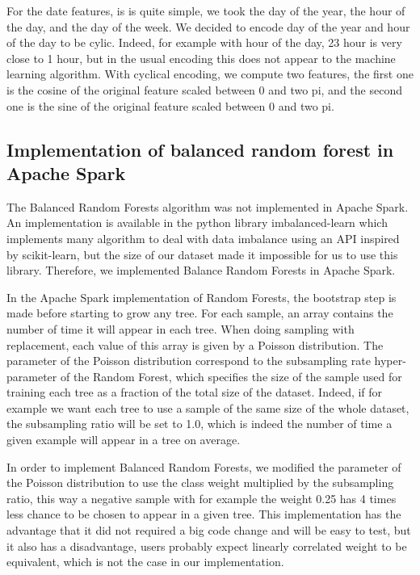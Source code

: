 \documentclass[conference]{IEEEtran}
\begin{document}
For the date features, is is quite simple, we took the day of the year, the hour of the day, and the day of the week. We decided to encode day of the year and hour of the day to be cylic. Indeed, for example with hour of the day, 23 hour is very close to 1 hour, but in the usual encoding this does not appear to the machine learning algorithm. With cyclical encoding, we compute two features, the first one is the cosine of the original feature scaled between 0 and two pi, and the second one is the sine of the original feature scaled between 0 and two pi.

\subsection{Implementation of balanced random forest in Apache Spark}
The Balanced Random Forests algorithm was not implemented in Apache Spark. An implementation is available in the python library imbalanced-learn\cite{imbalance} which implements many algorithm to deal with data imbalance using an API inspired by scikit-learn, but the size of our dataset made it impossible for us to use this library. Therefore, we implemented Balance Random Forests in Apache Spark. 

In the Apache Spark implementation of Random Forests, the bootstrap step is made before starting to grow any tree. For each sample, an array contains the number of time it will appear in each tree. When doing sampling with replacement, each value of this array is given by a Poisson distribution. The parameter of the Poisson distribution correspond to the subsampling rate hyper-parameter of the Random Forest, which specifies the size of the sample used for training each tree as a fraction of the total size of the dataset. Indeed, if for example we want each tree to use a sample of the same size of the whole dataset, the subsampling ratio will be set to 1.0, which is indeed the number of time a given example will appear in a tree on average. 

In order to implement Balanced Random Forests, we modified the parameter of the Poisson distribution to use the class weight multiplied by the subsampling ratio, this way a negative sample with for example the weight 0.25 has 4 times less chance to be chosen to appear in a given tree. This implementation has the advantage that it did not required a big code change and will be easy to test, but it also has a disadvantage, users probably expect linearly correlated weight to be equivalent, which is not the case in our implementation.
	
\end{document}
